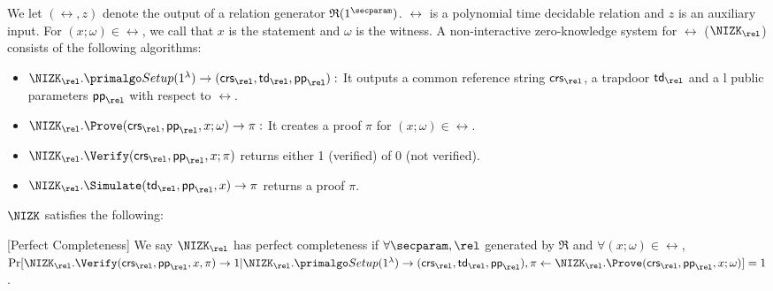 We let $ (\rel, z) $ denote the output of a relation generator $ \mathfrak{R}(1^\secparam) $. $ \rel $ is a polynomial time decidable relation and $ z $ is an auxiliary input. For $ (x; \omega) \in \rel $, we call that $x$ is the statement and $ \omega $ is the witness.
A non-interactive zero-knowledge system for $\rel$ ($ \NIZK_\rel $)  consists of the following algorithms:
\begin{itemize}
	\item $\NIZK_\rel.\Setup(1^{\lambda}) \rightarrow (\crs_\rel, \tw_\rel, \pp_\rel):$  It  outputs a common reference string $ \crs_\rel $, a trapdoor $ \tw_\rel $ and a l public parameters $\pp_\rel$ with respect to $ \rel $. 
	\item $\NIZK_\rel.\Prove(\crs_\rel, \pp_\rel, x; \omega) \rightarrow \pi:$ It creates a proof $\pi$ for  $(x; \omega) \in \rel$. 
	\item $\NIZK_\rel.\Verify(\crs_\rel, \pp_\rel, x; \pi)$ returns either 1 (verified) of 0 (not verified).
	\item $ \NIZK_\rel.\Simulate(\tw_\rel, \pp_\rel, x) \rightarrow \pi$ returns a proof $ \pi $.
\end{itemize}	
$ \NIZK $ satisfies the following:


\begin{definition}\label{def:nizk_completeness}[Perfect Completeness]
	We say $\NIZK_\rel$ has perfect completeness if $ \forall \secparam, \rel $ generated by $  \mathfrak{R} $ and $ \forall (x;\omega) \in \rel $,  $\Pr[\NIZK_\rel.\Verify(\crs_\rel,  \pp_\rel, x, \pi) \rightarrow 1|\NIZK_\rel.\Setup(1^{\lambda}) \rightarrow (\crs_\rel, \tw_\rel, \pp_\rel), \pi \leftarrow \NIZK_\rel.\Prove(\crs_\rel, \pp_\rel, x; \omega) ] = 1 $.  %
\end{definition}

